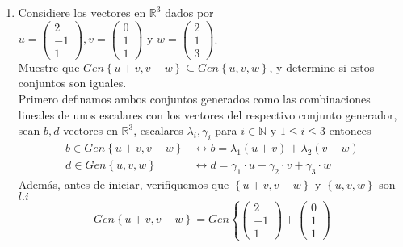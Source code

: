 \documentclass{article}
\begin{document}
\begin{enumerate}
\begin{enumerate}[label=\listAlph]
        \end{enumerate}
    \item Considiere los vectores en \(\mathbb{R}^3\) dados por 
        \(
            u = 
            \begin{pmatrix}
                2 \\ -1 \\ 1
            \end{pmatrix},
            v =
            \begin{pmatrix}
                0 \\ 1 \\ 1
            \end{pmatrix}
            \text{ y }
            w = 
            \begin{pmatrix}
                2 \\ 1 \\ 3
            \end{pmatrix}
        \). \\
        Muestre que \(Gen\left\{u + v, v - w\right\} \subseteq Gen\left\{u, v, w\right\}\), y determine si estos conjuntos son iguales. \\
        Primero definamos ambos conjuntos generados como las combinaciones lineales de unos escalares con los vectores del respectivo conjunto generador, 
        sean \(b, d\) vectores en \(\mathbb{R}^3\), escalares \(\lambda_i, \gamma_i\) para \(i \in \mathbb{N}\) y \(1 \leq i \leq 3\) entonces
        \[
            \begin{aligned}
                b \in Gen\left\{u + v, v - w\right\} &\leftrightarrow b = \lambda_1\left(u + v\right) + \lambda_2\left(v - w\right) \\
                d \in Gen\left\{u, v, w\right\} &\leftrightarrow d = \gamma_1 \cdot u + \gamma_2 \cdot v + \gamma_3 \cdot w 
            \end{aligned}
        \]
        Además, antes de iniciar, verifiquemos que \(\left\{u + v, v - w\right\}\) y \(\left\{u, v, w\right\}\) son \(l.i\)
        \[
            Gen\left\{u + v, v - w\right\} = 
            Gen\left\{
                \begin{pmatrix}
                    2 \\ -1 \\ 1
                \end{pmatrix}
                +
                \begin{pmatrix}
                    0 \\ 1 \\ 1

\end{pmatrix}\]
\end{enumerate}
\end{document}
